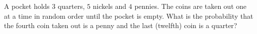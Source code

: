 A pocket holds $3$ quarters, $5$ nickels and $4$ pennies. The coins are taken out one at a time in random order until the pocket is empty. What is the probability that the fourth coin taken out is a penny and the last (twelfth) coin is a quarter?
